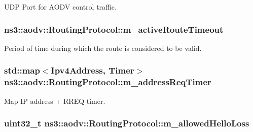U\+DP Port for A\+O\+DV control traffic. 

\subsubsection[{\texorpdfstring{m\+\_\+active\+Route\+Timeout}{m_activeRouteTimeout}}]{ ns3\+::aodv\+::\+Routing\+Protocol\+::m\+\_\+active\+Route\+Timeout\hspace{0.3cm}{\ttfamily [private]}}\hypertarget{classns3_1_1aodv_1_1RoutingProtocol_a37ec921ef1c48e4d8e7072fe989613d2}{}\label{classns3_1_1aodv_1_1RoutingProtocol_a37ec921ef1c48e4d8e7072fe989613d2}


Period of time during which the route is considered to be valid. 

\subsubsection[{\texorpdfstring{m\+\_\+address\+Req\+Timer}{m_addressReqTimer}}]{\setlength{\rightskip}{0pt plus 5cm}std\+::map$<${\bf Ipv4\+Address}, {\bf Timer}$>$ ns3\+::aodv\+::\+Routing\+Protocol\+::m\+\_\+address\+Req\+Timer\hspace{0.3cm}{\ttfamily [private]}}\hypertarget{classns3_1_1aodv_1_1RoutingProtocol_a3e21cac8acb05e13339eb0cabf13ddcf}{}\label{classns3_1_1aodv_1_1RoutingProtocol_a3e21cac8acb05e13339eb0cabf13ddcf}


Map IP address + R\+R\+EQ timer. 

\subsubsection[{\texorpdfstring{m\+\_\+allowed\+Hello\+Loss}{m_allowedHelloLoss}}]{\setlength{\rightskip}{0pt plus 5cm}uint32\+\_\+t ns3\+::aodv\+::\+Routing\+Protocol\+::m\+\_\+allowed\+Hello\+Loss\hspace{0.3cm}{\ttfamily [private]}}\hypertarget{classns3_1_1aodv_1_1RoutingProtocol_a80e1dc9b9a640570ba5d5270846a2f6f}{}\label{classns3_1_1aodv_1_1RoutingProtocol_a80e1dc9b9a640570ba5d5270846a2f6f}


